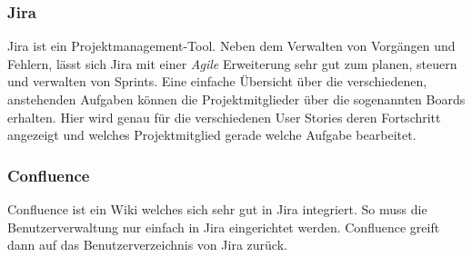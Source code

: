 \subsubsection{Jira}
Jira ist ein Projektmanagement-Tool. Neben dem Verwalten von Vorgängen und Fehlern, lässt sich Jira mit einer \textit{Agile} Erweiterung sehr gut zum planen, steuern und verwalten von Sprints. Eine einfache Übersicht über die verschiedenen, anstehenden Aufgaben können die Projektmitglieder über die sogenannten Boards erhalten. Hier wird genau für die verschiedenen User Stories deren Fortschritt angezeigt und welches Projektmitglied gerade welche Aufgabe bearbeitet.

\subsubsection{Confluence}
Confluence ist ein Wiki welches sich sehr gut in Jira integriert. So muss die Benutzerverwaltung nur einfach in Jira eingerichtet werden. Confluence greift dann auf das Benutzerverzeichnis von Jira zurück. 
